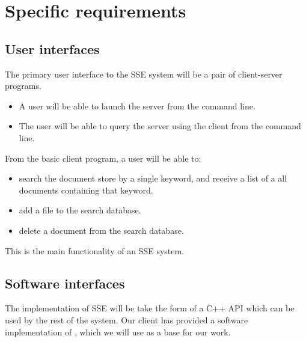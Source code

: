 \section{ Specific requirements } %


\subsection{ User interfaces }

The primary user interface to the SSE system will be a pair of client-server programs.
\begin{itemize}
\item A user will be able to launch the server from the command line.
\item The user will be able to query the server using the client from the command line.
\end{itemize}

From the basic client program, a user will be able to:

\begin{itemize}
\item search the document store by a single keyword, and receive a list of a all documents containing that keyword.
\item add a file to the search database.
\item delete a document from the search database.
\end{itemize}

This is the main functionality of an SSE system.


\subsection{ Software interfaces }

The implementation of SSE will be take the form of a C++ API which can be used by the rest of the system.
Our client has provided a software implementation of \cite{yavuz15}, which we will use as a base for our work.


